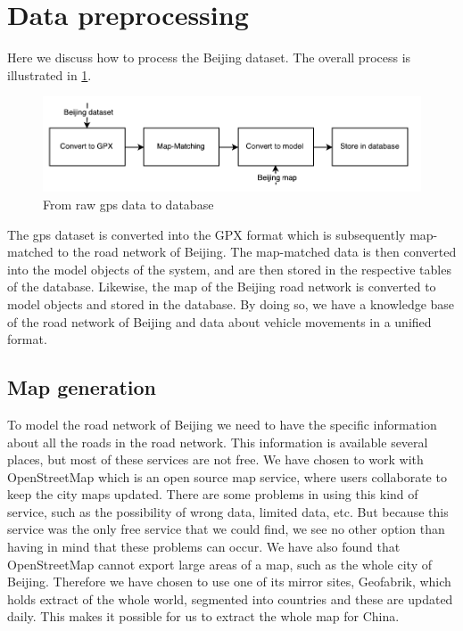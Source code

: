 \section{Data preprocessing}
Here we discuss how to process the Beijing dataset. The overall process is illustrated in \ref{fig:data-processing}.

\begin{figure}[h!]
  \centering
    \includegraphics[width=1\textwidth]{figures/data-processing.pdf}
    \caption{From raw gps data to database}
    \label{fig:data-processing}
\end{figure}

The gps dataset is converted into the GPX format which is subsequently map-matched to the road network of Beijing. The map-matched data is then converted into the model objects of the system, and are then stored in the respective tables of the database. Likewise, the map of the Beijing road network is converted to model objects and stored in the database. By doing so, we have a knowledge base of the road network of Beijing and data about vehicle movements in a unified format. 

\subsection{Map generation}%
To model the road network of Beijing we need to have the specific information about all the roads in the road network. This information is available several places, but most of these services are not free. We have chosen to work with OpenStreetMap which is an open source map service, where users collaborate to keep the city maps updated. There are some problems in using this kind of service, such as the possibility of wrong data, limited data, etc. But because this service was the only free service that we could find, we see no other option than having in mind that these problems can occur. We have also found that OpenStreetMap cannot export large areas of a map, such as the whole city of Beijing. Therefore we have chosen to use one of its mirror sites, Geofabrik, which holds extract of the whole world, segmented into countries and these are updated daily. This makes it possible for us to extract the whole map for China.

